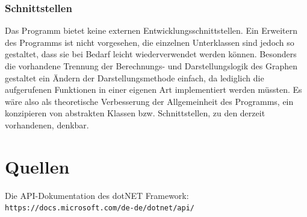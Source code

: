\documentclass[a4paper]{article}
\begin{document}
    \subsubsection{Schnittstellen}

    Das Programm bietet keine externen Entwicklungsschnittstellen.
    Ein Erweitern des Programms ist nicht vorgesehen, die einzelnen Unterklassen sind jedoch so gestaltet, dass sie bei Bedarf leicht wiederverwendet werden können.
    Besonders die vorhandene Trennung der Berechnungs- und Darstellungslogik des Graphen gestaltet ein Ändern der Darstellungsmethode einfach, da lediglich die aufgerufenen Funktionen in einer eigenen Art implementiert werden müssten.
    Es wäre also als theoretische Verbesserung der Allgemeinheit des Programms, ein konzipieren von abstrakten Klassen bzw. Schnittstellen, zu den derzeit vorhandenen, denkbar.

\newpage
\section{Quellen}

    Die API-Dokumentation des \glqq dotNET Framework\grqq{}:\\
    \verb|https://docs.microsoft.com/de-de/dotnet/api/|

\end{document}
